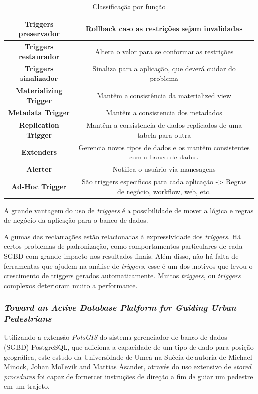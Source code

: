 \documentclass[conference]{IEEEtran}
\begin{document}
 \begin{table}[!t]
    \renewcommand{\arraystretch}{1}
    \caption{Classificação por função}
    \label{table_example}
    \centering
    \begin{tabular}{ c  c  }
      \hline 
           \bfseries Triggers preservador &
           Rollback caso as restrições sejam invalidadas \\
      \hline 
            \bfseries Triggers restaurador &
           Altera o valor para se conformar as restrições \\
      \hline 
            \bfseries Triggers sinalizador &
           Sinaliza para a aplicação, que deverá cuidar do problema \\
      \hline 
            \bfseries Materializing Trigger &
           Mantêm a consistência da materialized view \\
      \hline 
           \bfseries Metadata Trigger &
           Mantêm a consistencia dos metadados \\
      \hline 
           \bfseries Replication Trigger &
           Mantêm a consistencia de dados replicados de uma tabela para outra \\
      \hline 
           \bfseries Extenders &
           Gerencia novos tipos de dados e os mantêm consistentes com o banco de dados. \\
      \hline 
          \bfseries  Alerter &
           Notifica o usuário via manesagens \\
      \hline 
           \bfseries  Ad-Hoc Trigger &
            São triggers especificos para cada aplicação -> Regras de negócio, workflow, web, etc. \\
        \end{tabular}
    \end{table}

    A grande vantagem do uso de \textit{triggers} é a possibilidade de mover a lógica e regras de negócio da aplicação para o banco de dados.

    Algumas das reclamações estão relacionadas à expressividade dos \textit{triggers}. Há certos problemas de padronização, como comportamentos particulares de cada SGBD com grande impacto nos resultados finais. Além disso, não há falta de ferramentas que ajudem na análise de \textit{triggers}, esse é um dos motivos que levou o crescimento de triggers gerados automaticamente. Muitos \textit{triggers}, ou \textit{triggers} complexos deterioram muito a performance.

    \subsubsection{\textit{Toward an Active Database Platform for Guiding Urban Pedestrians}}
    Utilizando a extensão \textit{PotsGIS} do sistema gerenciador de banco de dados (SGBD) PostgreSQL, que adiciona a capacidade de um tipo de dado para posição geográfica, este estudo da Universidade de Ume\r{a} na Suécia de autoria de Michael Minock, Johan Mollevik and Mattias \r{A}sander, através do uso extensivo de \textit{stored procedures} foi capaz de fornercer instruções de direção a fim de guiar um pedestre em um trajeto.
\end{document}
